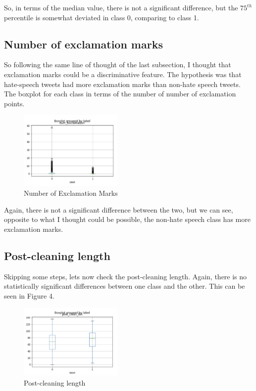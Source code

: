 \documentclass{article}
\begin{document}
	So, in terms of the median value, there is not a significant difference, but the $75^{th}$ percentile is somewhat deviated in class 0, comparing to class 1.  
	
	\subsection{Number of exclamation marks}
	
	So following the same line of thought of the last subsection, I thought that exclamation marks could be a discriminative feature. The hypothesis was that hate-speech tweets had more exclamation marks than non-hate speech tweets. The boxplot for each class in terms of the number of number of exclamation points. 
	
	\begin{figure}[h!]
		\label{Figure 2}
		\caption{Number of Exclamation Marks}
		\includegraphics[width=50mm]{postcleanlength.png}
		\centering
	\end{figure}
	
	Again, there is not a significant difference between the two, but we can see, opposite to what I thought could be possible, the non-hate speech class has more exclamation marks. 
		
	\subsection{Post-cleaning length}
	
	Skipping some steps, lets now check the post-cleaning length. Again, there is no statistically  significant differences between one class and the other. This can be seen in Figure 4. 
	
	\begin{figure}[h!]
		\label{Figure 3}
		\caption{Post-cleaning length}
		\includegraphics[width=50mm]{post.png}
		\centering
	\end{figure}
\end{document}
